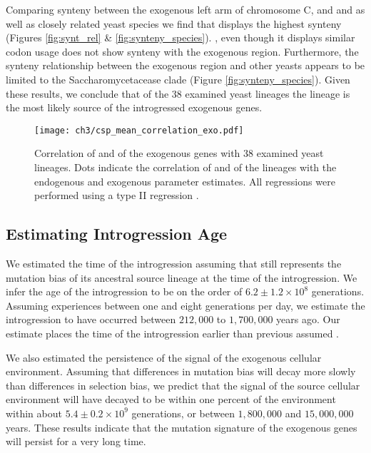 Comparing synteny between the exogenous left arm of chromosome C, and \gossypii and \dubl as well as closely related yeast species we find that \gossypii displays the highest synteny (Figures \ref{fig:synt_rel} \& \ref{fig:synteny_species}).
\dubl, even though it displays similar codon usage does not show synteny with the exogenous region.
Furthermore, the synteny relationship between the exogenous region and other yeasts appears to be limited to the Saccharomycetacease clade (Figure \ref{fig:synteny_species}).
Given these results, we conclude that of the 38 examined yeast lineages the \gossypii lineage is the most likely source of the introgressed exogenous genes.

\singlespacing
\begin{figure}
     \centering
	\texttt{[image: ch3/csp\_mean\_correlation\_exo.pdf]}
	\caption{Correlation of \DM and \DE of the exogenous genes with 38 examined yeast lineages. 
	Dots indicate the correlation of \DM and \DE of the lineages with the endogenous and exogenous parameter estimates. 
	All regressions were performed using a type II regression \citep{SokalAndRohlf1981}.}
	\label{fig:csp_exo_comp}
\end{figure}
\doublespacing

\subsection{Estimating Introgression Age}

We estimated the time of the introgression assuming that \gossypii still represents the mutation bias of its ancestral source lineage at the time of the introgression.
We infer the age of the introgression to be on the order of $6.2\pm1.2\times 10^8$ generations. 
Assuming \kluyveri experiences between one and eight generations per day, we estimate the introgression to have occurred between $212,000$ to $1,700,000$ years ago.
Our estimate places the time of the introgression earlier than previous assumed \citet{friedrich2015}.

We also estimated the persistence of the signal of the exogenous cellular environment.
Assuming that differences in mutation bias will decay more slowly than differences in selection bias, we predict that the \DM signal of the source cellular environment will have decayed to be within one percent of the \kluyveri environment within about $5.4\pm0.2\times 10^9 $ generations, or between $1,800,000$ and $15,000,000$ years.
These results indicate that the mutation signature of the exogenous genes will persist for a very long time.

